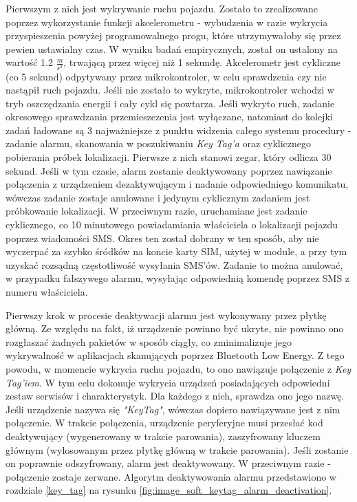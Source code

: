 Pierwszym z nich jest wykrywanie ruchu pojazdu. Zostało to zrealizowane poprzez wykorzystanie funkcji akcelerometru - wybudzenia w razie wykrycia przyspieszenia powyżej programowalnego progu, które utrzymywałoby się przez pewien ustawialny czas. W wyniku badań empirycznych, został on ustalony na wartość 1.2 $\frac{m}{s^2}$, trwającą przez więcej niż 1 sekundę. Akcelerometr jest cykliczne (co 5 sekund) odpytywany przez mikrokontroler, w celu sprawdzenia czy nie nastąpił ruch pojazdu. Jeśli nie zostało to wykryte, mikrokontroler wchodzi w tryb oszczędzania energii i cały cykl się powtarza. Jeśli wykryto ruch, zadanie okresowego sprawdzania przemieszczenia jest wyłączane, natomiast do kolejki zadań ładowane są 3 najważniejsze z punktu widzenia całego systemu procedury - zadanie alarmu, skanowania w poszukiwaniu \textit{Key Tag'a} oraz cyklicznego pobierania próbek lokalizacji. Pierwsze z nich stanowi zegar, który odlicza 30 sekund. Jeśli w tym czasie, alarm zostanie deaktywowany poprzez nawiązanie połączenia z urządzeniem dezaktywującym i nadanie odpowiedniego komunikatu, wówczas zadanie zostaje anulowane i jedynym cyklicznym zadaniem jest próbkowanie lokalizacji. W przeciwnym razie, uruchamiane jest zadanie cyklicznego, co 10 minutowego powiadamiania właściciela o lokalizacji pojazdu poprzez wiadomości SMS. Okres ten został dobrany w ten sposób, aby nie wyczerpać za szybko śródków na koncie karty SIM, użytej w module, a przy tym uzyskać rozsądną częstotliwość wysyłania SMS'ów. Zadanie to można anulować, w przypadku fałszywego alarmu, wysyłając odpowiednią komendę poprzez SMS z numeru właściciela. 

Pierwszy krok w procesie deaktywacji alarmu jest wykonywany przez płytkę główną. Ze względu na fakt, iż urządzenie powinno być ukryte, nie powinno ono rozgłaszać żadnych pakietów w sposób ciągły, co zminimalizuje jego wykrywalność w aplikacjach skanujących poprzez Bluetooth Low Energy. Z tego powodu, w momencie wykrycia ruchu pojazdu, to ono nawiązuje połączenie z \textit{Key Tag'iem}. W tym celu dokonuje wykrycia urządzeń posiadających odpowiedni zestaw serwisów i charakterystyk. Dla każdego z nich, sprawdza ono jego nazwę. Jeśli urządzenie nazywa się \textit{"KeyTag"}, wówczas dopiero nawiązywane jest z nim połączenie. W trakcie połączenia, urządzenie peryferyjne musi przesłać kod deaktywujący (wygenerowany w trakcie parowania), zaszyfrowany kluczem głównym (wylosowanym przez płytkę główną w trakcie parowania). Jeśli zostanie on poprawnie odszyfrowany, alarm jest deaktywowany. W przeciwnym razie - połączenie zostaje zerwane. Algorytm deaktywowania alarmu przedstawiono w rozdziale \ref{key_tag} na rysunku \ref{fig:image_soft_keytag_alarm_deactivation}.


